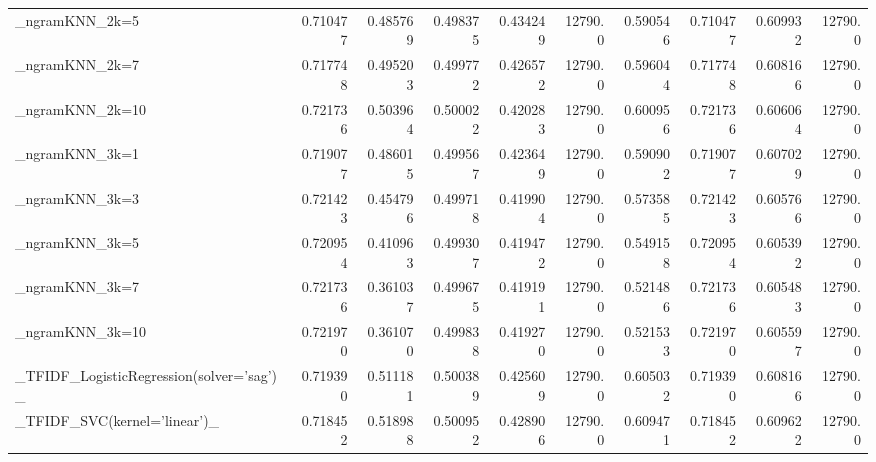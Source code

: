 \begin{tabular}{lrrrrrrrrr}
\_ngramKNN\_2k=5                                     &  0.710477 &         0.485769 &      0.498375 &        0.434249 &        12790.0 &            0.590546 &         0.710477 &           0.609932 &           12790.0 \\
\_ngramKNN\_2k=7                                     &  0.717748 &         0.495203 &      0.499772 &        0.426572 &        12790.0 &            0.596044 &         0.717748 &           0.608166 &           12790.0 \\
\_ngramKNN\_2k=10                                    &  0.721736 &         0.503964 &      0.500022 &        0.420283 &        12790.0 &            0.600956 &         0.721736 &           0.606064 &           12790.0 \\
\_ngramKNN\_3k=1                                     &  0.719077 &         0.486015 &      0.499567 &        0.423649 &        12790.0 &            0.590902 &         0.719077 &           0.607029 &           12790.0 \\
\_ngramKNN\_3k=3                                     &  0.721423 &         0.454796 &      0.499718 &        0.419904 &        12790.0 &            0.573585 &         0.721423 &           0.605766 &           12790.0 \\
\_ngramKNN\_3k=5                                     &  0.720954 &         0.410963 &      0.499307 &        0.419472 &        12790.0 &            0.549158 &         0.720954 &           0.605392 &           12790.0 \\
\_ngramKNN\_3k=7                                     &  0.721736 &         0.361037 &      0.499675 &        0.419191 &        12790.0 &            0.521486 &         0.721736 &           0.605483 &           12790.0 \\
\_ngramKNN\_3k=10                                    &  0.721970 &         0.361070 &      0.499838 &        0.419270 &        12790.0 &            0.521533 &         0.721970 &           0.605597 &           12790.0 \\
\_TFIDF\_LogisticRegression(solver='sag')\_           &  0.719390 &         0.511181 &      0.500389 &        0.425609 &        12790.0 &            0.605032 &         0.719390 &           0.608166 &           12790.0 \\
\_TFIDF\_SVC(kernel='linear')\_                       &  0.718452 &         0.518988 &      0.500952 &        0.428906 &        12790.0 &            0.609471 &         0.718452 &           0.609622 &           12790.0 \\

\end{tabular}
